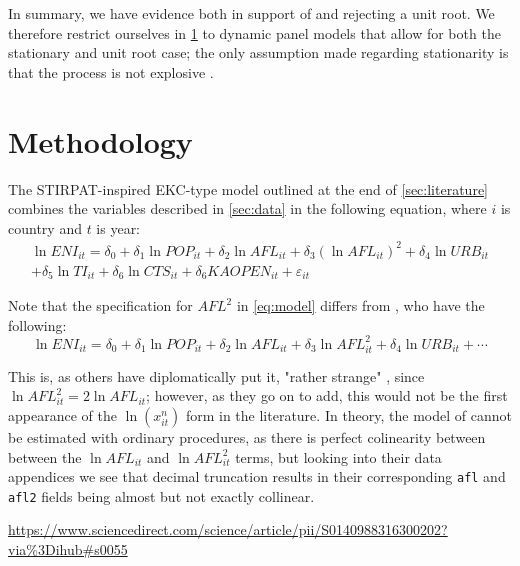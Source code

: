 \documentclass[12pt,a4paper]{article}
\begin{document}
In summary, we have evidence both in support of and rejecting a unit root.
We therefore restrict ourselves in \cref{sec:methodology} to dynamic panel models that allow for both the stationary and unit root case; the only assumption made regarding stationarity is that the process is not explosive \cite[p.5, A.2.1]{fritschGMMEstimationLinear2019}.

\FloatBarrier

\section{Methodology}\label{sec:methodology}

The STIRPAT-inspired EKC-type model outlined at the end of \cref{sec:literature} combines the variables described in \cref{sec:data} in the following equation, where $i$ is country and $t$ is year:
\begin{multline}\label{eq:model}
\ln ENI_{it} = \delta_0 + \delta_1 \ln POP_{it} + \delta_2 \ln AFL_{it} + \delta_3 \left( \ln AFL_{it} \right)^2 + \delta_4 \ln URB_{it} \\ + \delta_5 \ln TI_{it} + \delta_6 \ln CTS_{it} + \delta_6 KAOPEN_{it} + \varepsilon_{it}
\end{multline}

Note that the specification for $AFL^2$ in \cref{eq:model} differs from \cite[Equation 4]{rafiqUrbanizationOpennessEmissions2016}, who have the following:
\begin{equation*}\label{eq:rafiqmodel}
\ln ENI_{it} = \delta_0 + \delta_1 \ln POP_{it} + \delta_2 \ln AFL_{it} + \delta_3 \ln AFL_{it}^2 + \delta_4 \ln URB_{it} + \cdots
\end{equation*}

This is, as others have diplomatically put it, "rather strange" \cite[p.4936]{moosaEconometricsEnvironmentalKuznets2017}, since $\ln AFL_{it}^2 = 2 \ln AFL_{it}$; however, as they go on to add, this would not be the first appearance of the $\ln \left( x^n_{it} \right)$ form in the literature.
In theory, the model of \cite{rafiqUrbanizationOpennessEmissions2016} cannot be estimated with ordinary procedures, as there is perfect colinearity between between the $\ln AFL_{it}$ and $\ln AFL_{it}^2$ terms, but looking into their data appendices\footnotemark{} we see that decimal truncation results in their corresponding \texttt{afl} and \texttt{afl2} fields being almost but not exactly collinear.

\urldef{\rafiqdata}\url{https://www.sciencedirect.com/science/article/pii/S0140988316300202?via%3Dihub#s0055}
\end{document}
